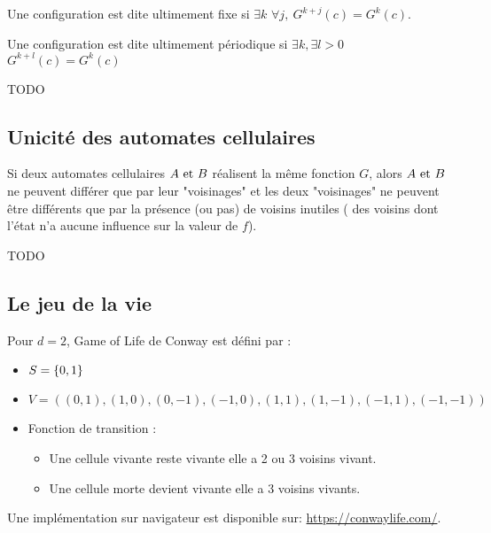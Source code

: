 \begin{definition}
	Une configuration est dite ultimement fixe si $\exists k$ \tq $\forall j, \ G^{k+j}(c) =  G^{k}(c)$.
\end{definition}


\begin{definition}
	Une configuration est dite ultimement périodique si $\exists k, \exists l>0$ \tq $ G^{k+l}(c) =  G^{k}(c)$
\end{definition}


\begin{exemple}
	TODO
\end{exemple}


\subsection{Unicité des automates cellulaires}


\begin{theorem}
	Si deux automates cellulaires $A \text{ et } B$ réalisent la même fonction $G$, alors $A \text{ et } B$ ne peuvent différer que par
	leur "voisinages" et les deux "voisinages" ne peuvent être différents que par la présence (ou pas) de voisins inutiles (\cad
	des voisins dont l'état n'a aucune influence sur la valeur de $f$).
\end{theorem}


\begin{exemple}
	TODO
\end{exemple}

\subsection{Le jeu de la vie}

\begin{exemple}
	Pour $d = 2$, Game of Life de Conway \cite{conwayGOL} est défini par :
	\begin{itemize}
		\item $S = \left\{0,1\right\}$
		\item $V = ((0,1), (1,0), (0,-1), (-1,0), (1,1), (1,-1), (-1,1), (-1,-1))$
		\item Fonction de transition :
		      \begin{itemize}
			      \item Une cellule vivante reste vivante \ssi elle a 2 ou 3 voisins vivant.
			      \item Une cellule morte devient vivante \ssi elle a 3 voisins vivants.
		      \end{itemize}
	\end{itemize}


	Une implémentation sur navigateur est disponible sur: \url{https://conwaylife.com/}.
\end{exemple}

